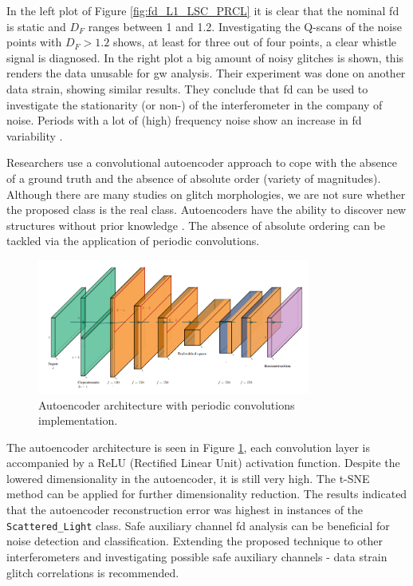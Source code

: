 In the left plot of Figure \ref{fig:fd_L1_LSC_PRCL} it is clear that the nominal \acrshort{fd} is static and $D_{F}$ ranges between 1 and 1.2. Investigating the Q-scans of the noise points with $D_{F} > 1.2$ shows, at least for three out of four points, a clear whistle signal is diagnosed. In the right plot a big amount of noisy glitches is shown, this renders the data unusable for \acrshort{gw} analysis. Their experiment was done on another data strain, showing similar results. They conclude that \acrshort{fd} can be used to investigate the stationarity (or non-) of the interferometer in the company of noise.  Periods with a lot of (high) frequency noise show an increase in \acrshort{fd} variability \citep{cavaglia2022characterization}.

Researchers \citep{laguarta2023detection} use a convolutional autoencoder approach to cope with the absence of a ground truth and the absence of absolute order (variety of magnitudes). Although there are many studies on glitch morphologies, we are not sure whether the proposed class is the real class. Autoencoders have the ability to discover new structures without prior knowledge \citep{bank2023autoencoders}. The absence of absolute ordering can be tackled via the application of periodic convolutions. 
\begin{figure}
    \centering
    \includegraphics[width=0.8\textwidth]{Images/autoencoder_periodic_convolution.png}
    \caption{Autoencoder architecture with periodic convolutions implementation. \citep{laguarta2023detection}}
    \label{fig:autoencoder_laguarta}
\end{figure}
The autoencoder architecture is seen in Figure \ref{fig:autoencoder_laguarta}, each convolution layer is accompanied by a ReLU (Rectified Linear Unit) activation function. Despite the lowered dimensionality in the autoencoder, it is still very high. The t-SNE method can be applied for further dimensionality reduction. 
The results indicated that the autoencoder reconstruction error was highest in instances of the \verb|Scattered_Light| class. 
Safe auxiliary channel \acrshort{fd} analysis can be beneficial for noise detection and classification. Extending the proposed technique to other interferometers and investigating possible safe auxiliary channels - data strain glitch correlations is recommended.

